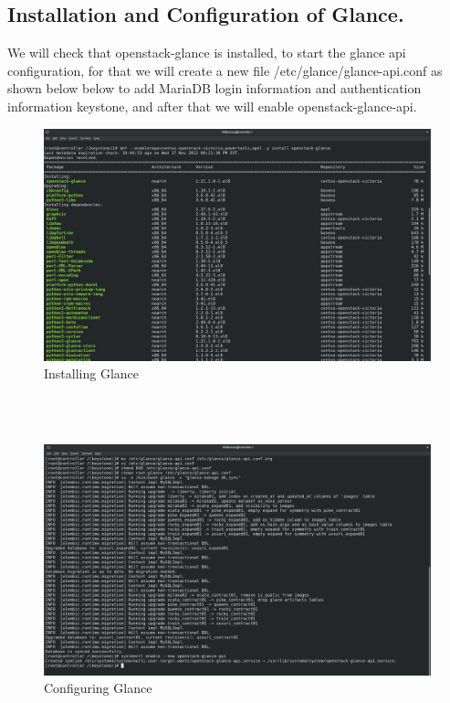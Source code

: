 \begin{spacing}{1.2}
\section{Installation and Configuration of Glance.}
\par We will check that openstack-glance is installed, to start the glance api configuration, for that we will create a new file /etc/glance/glance-api.conf as shown below below to add MariaDB login information and authentication information
keystone, and after that we will enable openstack-glance-api. 
\\
\begin{figure}[!htb] 
\begin{center} 
\includegraphics[width=1\linewidth]{Cloud/Configure Glance/Installing Glance} 
\end{center} 
\caption{Installing Glance} 
\end{figure}  \FloatBarrier
\\
\\
\begin{figure}[!htb] 
\begin{center} 
\includegraphics[width=1\linewidth]{Cloud/Configure Glance/Configuring Glance} 
\end{center} 
\caption{Configuring Glance} 
\end{figure}  \FloatBarrier
\\



\end{spacing}
